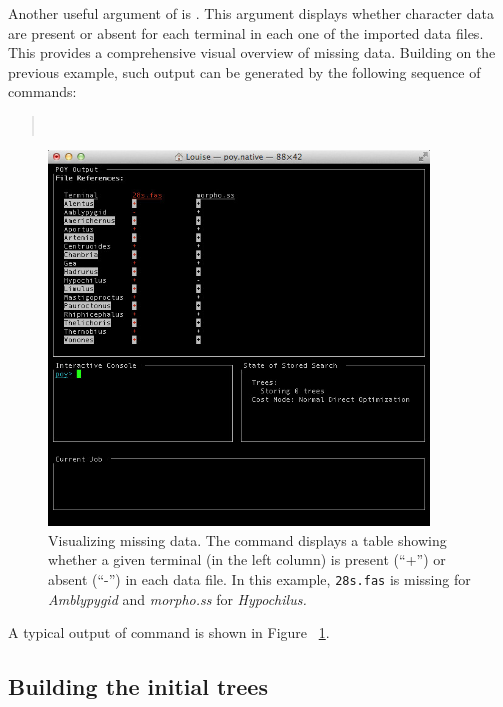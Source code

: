 {Another useful argument of  is . This argument displays whether character data are present or absent for each terminal in each one of the imported data files. This provides a comprehensive visual overview of missing data. Building on the previous example, such output can be generated by the following sequence of commands:
\begin{quote}
    \\
\end{quote}

\begin{figure}[]
    \begin{center}
        \includegraphics[width=0.9\textwidth]{doc/figures/crossref.jpg}
    \end{center}
    \caption{Visualizing missing data. The command  displays a table showing whether a given terminal (in the left column) is present (``+'') or absent (``-'') in each data file. In this example, \texttt{28s.fas} is missing for \emph{Amblypygid} and \emph{morpho.ss} for \emph{Hypochilus.}}
    \label{fig:crossref}
\end{figure}

A typical output of  command is shown in Figure ~\ref{fig:crossref}.

\subsection{Building the initial trees}

}
